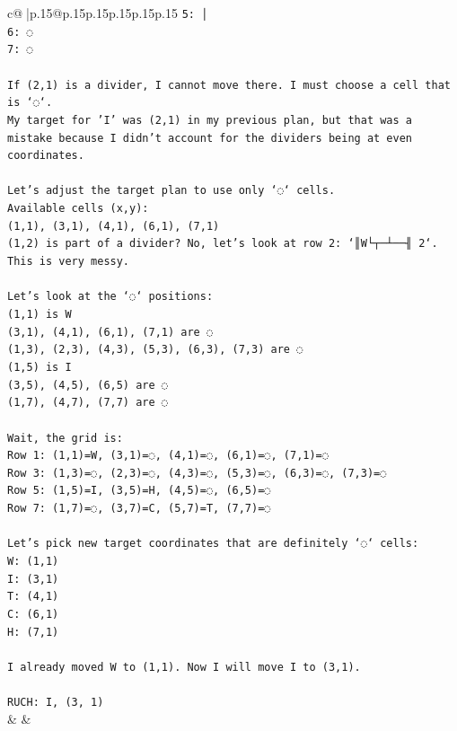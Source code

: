 \documentclass{article}
\begin{document}
{\begin{supertabular}{c@{$\;$}|p{.15\linewidth}@{}p{.15\linewidth}p{.15\linewidth}p{.15\linewidth}p{.15\linewidth}p{.15\linewidth}}
{{{\texttt{5: │} \\
\texttt{6: ◌} \\
\texttt{7: ◌} \\
\\ 
\texttt{If (2,1) is a divider, I cannot move there. I must choose a cell that is `◌`.} \\
\texttt{My target for 'I' was (2,1) in my previous plan, but that was a mistake because I didn't account for the dividers being at even coordinates.} \\
\\ 
\texttt{Let's adjust the target plan to use only `◌` cells.} \\
\texttt{Available cells (x,y):} \\
\texttt{(1,1), (3,1), (4,1), (6,1), (7,1)} \\
\texttt{(1,2) is part of a divider? No, let's look at row 2: `║W└┬─┴──╢ 2`. This is very messy.} \\
\\ 
\texttt{Let's look at the `◌` positions:} \\
\texttt{(1,1) is W} \\
\texttt{(3,1), (4,1), (6,1), (7,1) are ◌} \\
\texttt{(1,3), (2,3), (4,3), (5,3), (6,3), (7,3) are ◌} \\
\texttt{(1,5) is I} \\
\texttt{(3,5), (4,5), (6,5) are ◌} \\
\texttt{(1,7), (4,7), (7,7) are ◌} \\
\\ 
\texttt{Wait, the grid is:} \\
\texttt{Row 1: (1,1)=W, (3,1)=◌, (4,1)=◌, (6,1)=◌, (7,1)=◌} \\
\texttt{Row 3: (1,3)=◌, (2,3)=◌, (4,3)=◌, (5,3)=◌, (6,3)=◌, (7,3)=◌} \\
\texttt{Row 5: (1,5)=I, (3,5)=H, (4,5)=◌, (6,5)=◌} \\
\texttt{Row 7: (1,7)=◌, (3,7)=C, (5,7)=T, (7,7)=◌} \\
\\ 
\texttt{Let's pick new target coordinates that are definitely `◌` cells:} \\
\texttt{W: (1,1)} \\
\texttt{I: (3,1)} \\
\texttt{T: (4,1)} \\
\texttt{C: (6,1)} \\
\texttt{H: (7,1)} \\
\\ 
\texttt{I already moved W to (1,1). Now I will move I to (3,1).} \\
\\ 
\texttt{RUCH: I, (3, 1)} \\
            }
        }
    }
    & & \\ \\


\end{supertabular}}
\end{document}
